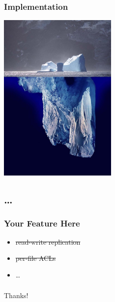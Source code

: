 \documentclass{beamer}
\begin{document}
\begin{frame}
\frametitle{Implementation}
\includegraphics[height=3.3in]{iceberg}
\end{frame}

\subsection{\ldots}

\begin{frame}
\frametitle{Your Feature Here}
\begin{itemize}
\item{\sout{read-write replication}}
\item{\sout{per-file ACLs}}
\item{\ldots}
\end{itemize}
\end{frame}

\begin{frame}
\frametitle{}
\Large{Thanks!}
\end{frame}
\end{document}
